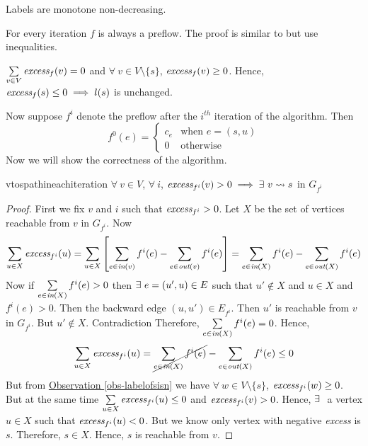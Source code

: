 \begin{observation}\label{obs-labelsmonotone}
	Labels are monotone non-decreasing.
\end{observation}
\begin{observation}\label{obs-everyiterationpreflow}
	For every iteration $f$ is always a preflow. The proof is similar to  but use inequalities.
\end{observation}
\begin{observation}\label{obs-labelofsisn}
	$\sum\limits_{v\in V}\emph{excess}_f(v)=0$  and $\forall\ v\in V\setminus \{s\}$, $\emph{excess}_f(v)\geq 0$. Hence, $\emph{excess}_f(s)\leq 0\implies l(s)$ is unchanged.
\end{observation}

Now suppose $f^i$ denote the preflow after the $i^{th}$ iteration of the algorithm. Then $$f^0(e)=\begin{cases}
		c_e & \text{when $e=(s,u)$} \\ 0 & \text{otherwise}
	\end{cases}$$
Now we will show the correctness of the algorithm.
\begin{lemma}{}{vtospathineachiteration}
	$\forall\ v\in V$, $\forall\ i$, $\emph{excess}_{f^i}(v)>0\implies\exs\ v\rightsquigarrow s$ in $G_{f^i}$
\end{lemma}
\begin{proof}
	First we fix $v$ and $i$ such that $\emph{excess}_{f^i}>0$. Let $X$ be the set of vertices reachable from $v$ in $G_{f^i}$. Now
	$$
		\sum_{u\in X}\emph{excess}_{f^i}(u) =\sum_{u\in X}\left[ \sum_{e\in \emph{in}(v)}f^i(e)-\sum_{e\in\emph{out}(v)}f^i(e) \right]= \sum_{e\in \emph{in}(X)}f^{i}(e)-\sum_{e\in\emph{out}{(X)}}f^{i}(e)$$
	Now if $\sum\limits_{e\in \emph{in}(X)}f^{i}(e)>0$ then $\exs\ e=(u',u)\in E$ such that $u'\notin X$ and $u\in X$ and $f^{i}(e)>0$. Then the backward edge $(u,u')\in E_{f^i}$. Then $u'$ is reachable from $v$ in $G_{f^i}$. But $u'\notin X$. Contradiction \ctr Therefore, $\sum\limits_{e\in \emph{in}(X)}  f^{i}(e)=0$. Hence, $$\sum_{u\in X}  \emph{excess}_{f^i}(u)= \cancel{\sum_{e\in \emph{in}(X)}f^{i}(e)}-\sum_{e\in\emph{out}{(X)}}f^{i}(e)\leq 0$$But from \hyperref[obs-labelofsisn]{Observation \ref{obs-labelofsisn}}  we have $\forall\ w\in V\setminus\{s\}$, $\emph{excess}_{f^i}(w)\geq 0$. But at the same time $\sum\limits_{u\in X}  \emph{excess}_{f^i}(u)\leq 0$ and $\emph{excess}_{f^i}(v)>0$. Hence, $\exists\ $ a vertex $u\in X$ such that $\emph{excess}_{f^i}(u)< 0$. But we know only vertex with negative \emph{excess} is $s$. Therefore, $s\in X$. Hence, $s$ is reachable from $v$.
\end{proof}
